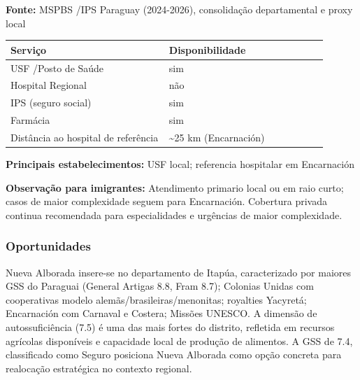 \textbf{Fonte:} MSPBS /\allowbreak  IPS Paraguay (2024-2026), consolidação
departamental e proxy local

{\def\LTcaptype{none} %
\begin{longtable}{@{}>{\raggedright\arraybackslash}p{0.45\linewidth} >{\raggedright\arraybackslash}p{0.45\linewidth}@{}}
\toprule\noalign{}
Serviço & Disponibilidade \\
\midrule\noalign{}
\endhead
\bottomrule\noalign{}
\endlastfoot
USF /\allowbreak  Posto de Saúde & sim \\
Hospital Regional & não \\
IPS (seguro social) & sim \\
Farmácia & sim \\
Distância ao hospital de referência & \textasciitilde25 km
(Encarnación) \\
\end{longtable}
}

\textbf{Principais estabelecimentos:} USF local; referencia hospitalar
em Encarnación

\textbf{Observação para imigrantes:} Atendimento primario local ou em
raio curto; casos de maior complexidade seguem para Encarnación.
Cobertura privada continua recomendada para especialidades e urgências
de maior complexidade.
\newpage

\subsubsection*{Oportunidades}\label{oport-nueva-alborada-0706}
Nueva Alborada insere-se no departamento de Itapúa, caracterizado por maiores GSS do Paraguai (General Artigas 8.8, Fram 8.7); Colonias Unidas com cooperativas modelo alemãs/brasileiras/menonitas; royalties Yacyretá; Encarnación com Carnaval e Costera; Missões UNESCO. A dimensão de autossuficiência (7.5) é uma das mais fortes do distrito, refletida em recursos agrícolas disponíveis e capacidade local de produção de alimentos. A GSS de 7.4, classificado como Seguro posiciona Nueva Alborada como opção concreta para realocação estratégica no contexto regional.

